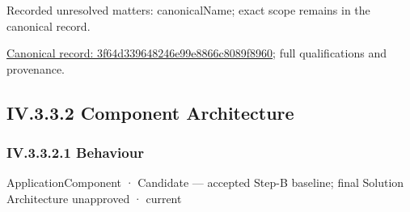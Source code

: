{\small Recorded unresolved matters: canonicalName; exact scope remains in the canonical record.}\par
{\footnotesize \href{../../../../../../../../continuum/application/application-component/3f64d339648246e99e8866c8089f8960.md}{Canonical record: 3f64d339648246e99e8866c8089f8960}; full qualifications and provenance.}\par
\subsection*{IV.3.3.2 Component Architecture}
\label{navigation:IV.3.3.2}

\subsubsection*{IV.3.3.2.1 Behaviour}
\label{navigation:IV.3.3.2.1}

\label{element:a26f06d66bec4981b266e202c46a9afb}
{\small ApplicationComponent · Candidate — accepted Step-B baseline; final Solution Architecture unapproved · current}\par


